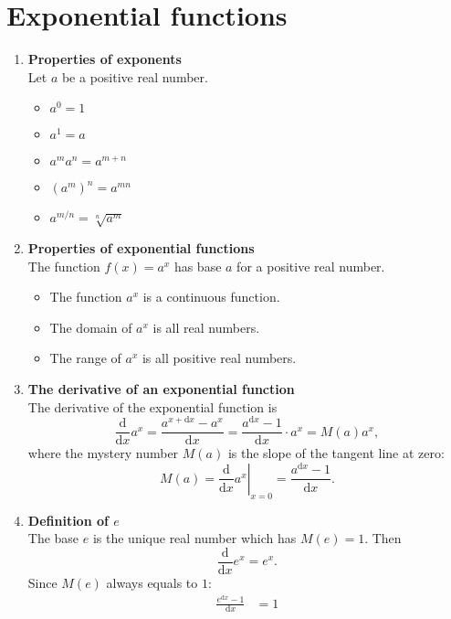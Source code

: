 \section{Exponential functions}
\begin{enumerate}
    \item \textbf{Properties of exponents}\\
        Let \(a\) be a positive real number.
        \begin{itemize}
            \item \(a^0=1\)
            \item \(a^1=a\)
            \item \(a^m a^n=a^{m+n}\)
            \item \((a^m)^n=a^{mn}\)
            \item \(a^{m/n}=\sqrt[n]{a^m}\)
        \end{itemize}
    \item \textbf{Properties of exponential functions}\\
        \indent The function \(f(x)=a^x\) has base \(a\) for a positive real number.
        \begin{itemize}
            \item The function \(a^x\) is a continuous function.
            \item The domain of \(a^x\) is all real numbers.
            \item The range of \(a^x\) is all positive real numbers.
        \end{itemize}
    \item \textbf{The derivative of an exponential function}\\
        \indent The derivative of the exponential function is
        \[
            \frac{\mathrm{d}}{\mathrm{d}x}a^x=\frac{a^{x+\mathrm{d}x}-a^x}{\mathrm{d}x}=\frac{a^{\mathrm{d}x}-1}{\mathrm{d}x}\cdot a^x=M(a)a^x,
        \]
        where the mystery number \(M(a)\) is the slope of the tangent line at zero:
        \[
            M(a)=\left.\frac{\mathrm{d}}{\mathrm{d}x}a^x\right|_{x=0}=\frac{a^{\mathrm{d}x}-1}{\mathrm{d}x}.
        \]
    \item \textbf{Definition of \(e\)}\\
        \indent The base \(e\) is the unique real number which has \(M(e)=1\). Then
        \[
            \frac{\mathrm{d}}{\mathrm{d}x}e^x=e^x.
        \]
        Since \(M(e)\) always equals to \(1\):
        \begin{align*}
            \frac{e^{\mathrm{d}x} -1}{\mathrm{d}x} & =1\\

\end{align*}
\end{enumerate}
